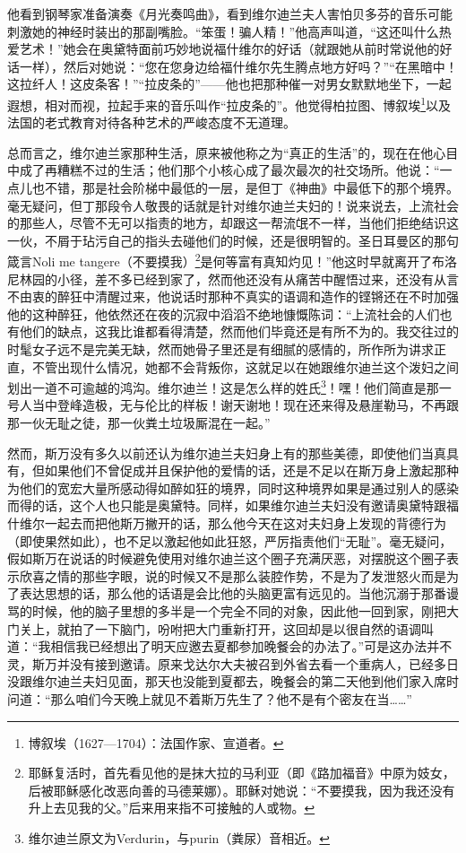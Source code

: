 \par 他看到钢琴家准备演奏《月光奏鸣曲》，看到维尔迪兰夫人害怕贝多芬的音乐可能刺激她的神经时装出的那副嘴脸。“笨蛋！骗人精！”他高声叫道，“这还叫什么热爱艺术！”她会在奥黛特面前巧妙地说福什维尔的好话（就跟她从前时常说他的好话一样），然后对她说：“您在您身边给福什维尔先生腾点地方好吗？”“在黑暗中！这拉纤人！这皮条客！”“拉皮条的”——他也把那种催一对男女默默地坐下，一起遐想，相对而视，拉起手来的音乐叫作“拉皮条的”。他觉得柏拉图、博叙埃\footnote{博叙埃（1627—1704）：法国作家、宣道者。}以及法国的老式教育对待各种艺术的严峻态度不无道理。
\par 总而言之，维尔迪兰家那种生活，原来被他称之为“真正的生活”的，现在在他心目中成了再糟糕不过的生活；他们那个小核心成了最次最次的社交场所。他说：“一点儿也不错，那是社会阶梯中最低的一层，是但丁《神曲》中最低下的那个境界。毫无疑问，但丁那段令人敬畏的话就是针对维尔迪兰夫妇的！说来说去，上流社会的那些人，尽管不无可以指责的地方，却跟这一帮流氓不一样，当他们拒绝结识这一伙，不屑于玷污自己的指头去碰他们的时候，还是很明智的。圣日耳曼区的那句箴言Noli me tangere（不要摸我）\footnote{耶稣复活时，首先看见他的是抹大拉的马利亚（即《路加福音》中原为妓女，后被耶稣感化改恶向善的马德莱娜）。耶稣对她说：“不要摸我，因为我还没有升上去见我的父。”后来用来指不可接触的人或物。}是何等富有真知灼见！”他这时早就离开了布洛尼林园的小径，差不多已经到家了，然而他还没有从痛苦中醒悟过来，还没有从言不由衷的醉狂中清醒过来，他说话时那种不真实的语调和造作的铿锵还在不时加强他的这种醉狂，他依然还在夜的沉寂中滔滔不绝地慷慨陈词：“上流社会的人们也有他们的缺点，这我比谁都看得清楚，然而他们毕竟还是有所不为的。我交往过的时髦女子远不是完美无缺，然而她骨子里还是有细腻的感情的，所作所为讲求正直，不管出现什么情况，她都不会背叛你，这就足以在她跟维尔迪兰这个泼妇之间划出一道不可逾越的鸿沟。维尔迪兰！这是怎么样的姓氏\footnote{维尔迪兰原文为Verdurin，与purin（粪尿）音相近。}！嘿！他们简直是那一号人当中登峰造极，无与伦比的样板！谢天谢地！现在还来得及悬崖勒马，不再跟那一伙无耻之徒，那一伙粪土垃圾厮混在一起。”
\par 然而，斯万没有多久以前还认为维尔迪兰夫妇身上有的那些美德，即使他们当真具有，但如果他们不曾促成并且保护他的爱情的话，还是不足以在斯万身上激起那种为他们的宽宏大量所感动得如醉如狂的境界，同时这种境界如果是通过别人的感染而得的话，这个人也只能是奥黛特。同样，如果维尔迪兰夫妇没有邀请奥黛特跟福什维尔一起去而把他斯万撇开的话，那么他今天在这对夫妇身上发现的背德行为（即使果然如此），也不足以激起他如此狂怒，严厉指责他们“无耻”。毫无疑问，假如斯万在说话的时候避免使用对维尔迪兰这个圈子充满厌恶，对摆脱这个圈子表示欣喜之情的那些字眼，说的时候又不是那么装腔作势，不是为了发泄怒火而是为了表达思想的话，那么他的话语是会比他的头脑更富有远见的。当他沉溺于那番谩骂的时候，他的脑子里想的多半是一个完全不同的对象，因此他一回到家，刚把大门关上，就拍了一下脑门，吩咐把大门重新打开，这回却是以很自然的语调叫道：“我相信我已经想出了明天应邀去夏都参加晚餐会的办法了。”可是这办法并不灵，斯万并没有接到邀请。原来戈达尔大夫被召到外省去看一个重病人，已经多日没跟维尔迪兰夫妇见面，那天也没能到夏都去，晚餐会的第二天他到他们家入席时问道：“那么咱们今天晚上就见不着斯万先生了？他不是有个密友在当……”

